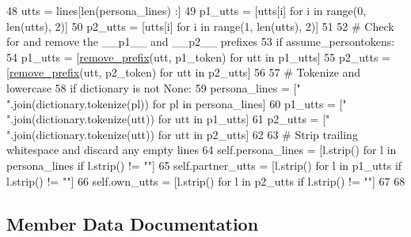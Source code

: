 \begin{DoxyCode}
48         utts = lines[len(persona\_lines) :]
49         p1\_utts = [utts[i] \textcolor{keywordflow}{for} i \textcolor{keywordflow}{in} range(0, len(utts), 2)]
50         p2\_utts = [utts[i] \textcolor{keywordflow}{for} i \textcolor{keywordflow}{in} range(1, len(utts), 2)]
51 
52         \textcolor{comment}{# Check for and remove the \_\_p1\_\_ and \_\_p2\_\_ prefixes}
53         \textcolor{keywordflow}{if} assume\_persontokens:
54             p1\_utts = [\hyperlink{namespaceprojects_1_1controllable__dialogue_1_1controllable__seq2seq_1_1util_accba1ac2dc7bedf184abe7d46120861c}{remove\_prefix}(utt, p1\_token) \textcolor{keywordflow}{for} utt \textcolor{keywordflow}{in} p1\_utts]
55             p2\_utts = [\hyperlink{namespaceprojects_1_1controllable__dialogue_1_1controllable__seq2seq_1_1util_accba1ac2dc7bedf184abe7d46120861c}{remove\_prefix}(utt, p2\_token) \textcolor{keywordflow}{for} utt \textcolor{keywordflow}{in} p2\_utts]
56 
57         \textcolor{comment}{# Tokenize and lowercase}
58         \textcolor{keywordflow}{if} dictionary \textcolor{keywordflow}{is} \textcolor{keywordflow}{not} \textcolor{keywordtype}{None}:
59             persona\_lines = [\textcolor{stringliteral}{" "}.join(dictionary.tokenize(pl)) \textcolor{keywordflow}{for} pl \textcolor{keywordflow}{in} persona\_lines]
60             p1\_utts = [\textcolor{stringliteral}{" "}.join(dictionary.tokenize(utt)) \textcolor{keywordflow}{for} utt \textcolor{keywordflow}{in} p1\_utts]
61             p2\_utts = [\textcolor{stringliteral}{" "}.join(dictionary.tokenize(utt)) \textcolor{keywordflow}{for} utt \textcolor{keywordflow}{in} p2\_utts]
62 
63         \textcolor{comment}{# Strip trailing whitespace and discard any empty lines}
64         self.persona\_lines = [l.strip() \textcolor{keywordflow}{for} l \textcolor{keywordflow}{in} persona\_lines \textcolor{keywordflow}{if} l.strip() != \textcolor{stringliteral}{""}]
65         self.partner\_utts = [l.strip() \textcolor{keywordflow}{for} l \textcolor{keywordflow}{in} p1\_utts \textcolor{keywordflow}{if} l.strip() != \textcolor{stringliteral}{""}]
66         self.own\_utts = [l.strip() \textcolor{keywordflow}{for} l \textcolor{keywordflow}{in} p2\_utts \textcolor{keywordflow}{if} l.strip() != \textcolor{stringliteral}{""}]
67 
68 
\end{DoxyCode}


\subsection{Member Data Documentation}
\mbox{\label{classprojects_1_1controllable__dialogue_1_1controllable__seq2seq_1_1util_1_1ConvAI2History_a12340ae0e928a10c22ea9abfebf02b30}} 
